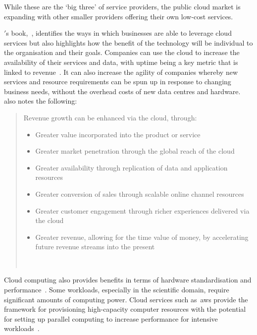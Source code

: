While these are the `big three' of service providers, the public cloud market is expanding with other smaller providers offering their own low-cost services.

\citet{weinman2012cloudonomics}\('\)s book,~\textit{}, identifies the ways in which businesses are able to leverage cloud services but also highlights how the benefit of the technology will be individual to the organisation and their goals.
Companies can use the cloud to increase the availability of their services and data,
with uptime being a key metric that is linked to revenue~\citep{weinman2012cloudonomics}.
It can also increase the agility of companies whereby new services and resource requirements can be spun up in response to changing business needs,
without the overhead costs of new data centres and hardware.
\citet{weinman2012cloudonomics} also notes the following:

\begin{quotation}
    Revenue growth can be enhanced via the cloud, through:
    \begin{itemize}
        \item Greater value incorporated into the product or service
        \item Greater market penetration through the global reach of the cloud
        \item Greater availability through replication of data and application resources
        \item Greater conversion of sales through scalable online channel resources
        \item Greater customer engagement through richer experiences delivered via the cloud
        \item Greater revenue, allowing for the time value of money, by accelerating future revenue streams into the present
    \end{itemize}~\citep{weinman2012cloudonomics}
\end{quotation}

Cloud computing also provides benefits in terms of hardware standardisation and performance~\citep{rehr_scientific}.
Some workloads, especially in the scientific domain, require significant amounts of computing power.
Cloud services such as~\gls{aws} provide the framework
for provisioning high-capacity computer resources with the potential
for setting up parallel computing to increase performance for intensive workloads~\citep{rehr_scientific}.

